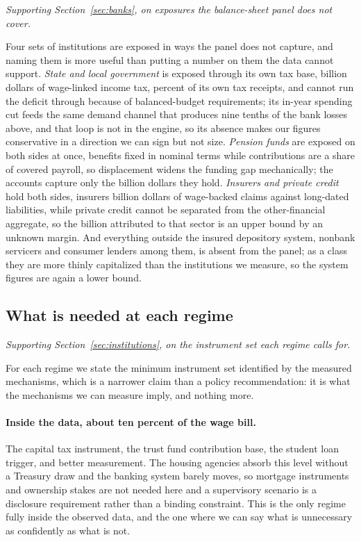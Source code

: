 \emph{Supporting Section~\ref{sec:banks}, on exposures the balance-sheet panel does not cover.}

Four sets of institutions are exposed in ways the panel does not capture, and naming them is more
useful than putting a number on them the data cannot support. \emph{State and local government} is
exposed through its own tax base,  billion dollars of wage-linked
income tax,  percent of its own tax receipts, and cannot run the
deficit through because of balanced-budget requirements; its in-year spending cut feeds the same
demand channel that produces nine tenths of the bank losses above, and that loop is not in the
engine, so its absence makes our figures conservative in a direction we can sign but not size.
\emph{Pension funds} are exposed on both sides at once, benefits fixed in nominal terms while
contributions are a share of covered payroll, so displacement widens the funding gap mechanically;
the accounts capture only the  billion dollars they hold.
\emph{Insurers and private credit} hold both sides, insurers  billion
dollars of wage-backed claims against long-dated liabilities, while private credit cannot be
separated from the other-financial aggregate, so the  billion
attributed to that sector is an upper bound by an unknown margin. And everything outside the
insured depository system, nonbank servicers and consumer lenders among them, is absent from the
panel; as a class they are more thinly capitalized than the institutions we measure, so the system
figures are again a lower bound.

\subsection{What is needed at each regime}

\emph{Supporting Section~\ref{sec:institutions}, on the instrument set each regime calls for.}

For each regime we state the minimum instrument set identified by the measured mechanisms, which
is a narrower claim than a policy recommendation: it is what the mechanisms we can measure imply,
and nothing more.

\paragraph{Inside the data, about ten percent of the wage bill.} The capital tax instrument, the
trust fund contribution base, the student loan trigger, and better measurement. The housing
agencies absorb this level without a Treasury draw and the banking system barely moves, so
mortgage instruments and ownership stakes are not needed here and a supervisory scenario is a
disclosure requirement rather than a binding constraint. This is the only regime fully inside the
observed data, and the one where we can say what is unnecessary as confidently as what is not.

